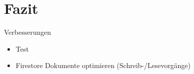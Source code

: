 \section{Fazit}\label{sec:fazit}
Verbesserungen
\begin{itemize}
    \item Test
    \item Firestore Dokumente optimieren (Schreib-/Lesevorgänge)
\end{itemize}